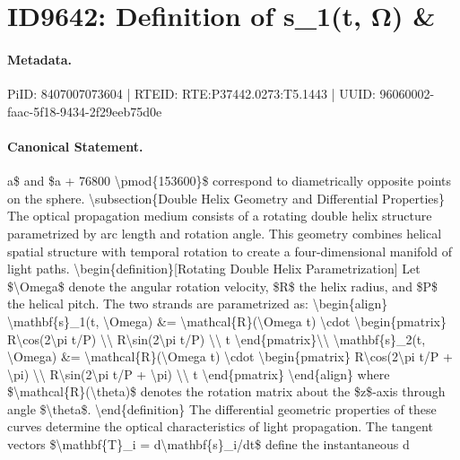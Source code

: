 \section*{ID9642: Definition of s\_1(t, Ω) \&}
\paragraph{Metadata.}
PiID: 8407007073604 | RTEID: RTE:P37442.0273:T5.1443 | UUID: 96060002-faac-5f18-9434-2f29eeb75d0e

\paragraph{Canonical Statement.}
a\$ and \$a + 76800 \textbackslash{}pmod\{153600\}\$ correspond to diametrically opposite points on the sphere. \textbackslash{}subsection\{Double Helix Geometry and Differential Properties\} The optical propagation medium consists of a rotating double helix structure parametrized by arc length and rotation angle. This geometry combines helical spatial structure with temporal rotation to create a four-dimensional manifold of light paths. \textbackslash{}begin\{definition\}[Rotating Double Helix Parametrization] Let \$\textbackslash{}Omega\$ denote the angular rotation velocity, \$R\$ the helix radius, and \$P\$ the helical pitch. The two strands are parametrized as: \textbackslash{}begin\{align\} \textbackslash{}mathbf\{s\}\_1(t, \textbackslash{}Omega) \&= \textbackslash{}mathcal\{R\}(\textbackslash{}Omega t) \textbackslash{}cdot \textbackslash{}begin\{pmatrix\} R\textbackslash{}cos(2\textbackslash{}pi t/P) \textbackslash{}\textbackslash{} R\textbackslash{}sin(2\textbackslash{}pi t/P) \textbackslash{}\textbackslash{} t \textbackslash{}end\{pmatrix\}\textbackslash{}\textbackslash{} \textbackslash{}mathbf\{s\}\_2(t, \textbackslash{}Omega) \&= \textbackslash{}mathcal\{R\}(\textbackslash{}Omega t) \textbackslash{}cdot \textbackslash{}begin\{pmatrix\} R\textbackslash{}cos(2\textbackslash{}pi t/P + \textbackslash{}pi) \textbackslash{}\textbackslash{} R\textbackslash{}sin(2\textbackslash{}pi t/P + \textbackslash{}pi) \textbackslash{}\textbackslash{} t \textbackslash{}end\{pmatrix\} \textbackslash{}end\{align\} where \$\textbackslash{}mathcal\{R\}(\textbackslash{}theta)\$ denotes the rotation matrix about the \$z\$-axis through angle \$\textbackslash{}theta\$. \textbackslash{}end\{definition\} The differential geometric properties of these curves determine the optical characteristics of light propagation. The tangent vectors \$\textbackslash{}mathbf\{T\}\_i = d\textbackslash{}mathbf\{s\}\_i/dt\$ define the instantaneous d

